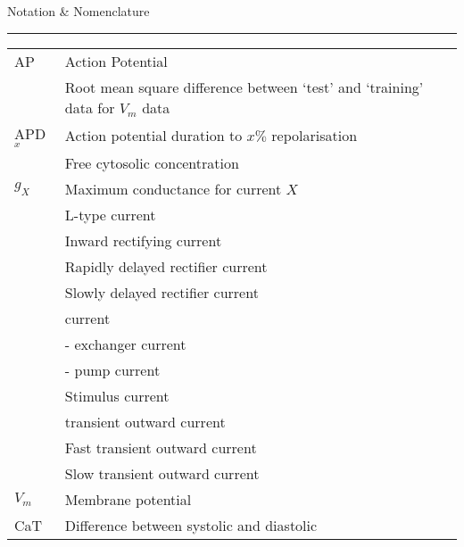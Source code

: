 \documentclass[../thesis-main.tex]{subfiles}
\begin{document}
 \vspace*{10mm}
 {
  \Large\em
  \begin{flushright}
   Notation \& Nomenclature
  \end{flushright}
  \rule{\linewidth}{0.25mm}
 }
 \label{sec:Notation}
 
 \begin{tabular}{p{2.5cm}p{10cm}}
  AP		& Action Potential \\
  \aprms	& Root mean square difference between `test' and `training' data for $V_m$ data \\
  APD$_x$	& Action potential duration to $x\%$ repolarisation \\
  \cai		& Free cytosolic \ca{} concentration \\
  $g_X$		& Maximum conductance for current $X$ \\
  \ica		& L-type \ca{} current \\
  \ikix		& Inward rectifying \K{} current \\
  \ikr		& Rapidly delayed rectifier \K{} current \\
  \iks		& Slowly delayed rectifier \K{} current \\
  \ina		& \na{} current \\
  \inaca	& \na{}-\ca{} exchanger current \\
  \inak		& \na{}-\K{} pump current \\
  \istim	& Stimulus current \\
  \ito		& \K{} transient outward current \\
  \itof		& Fast \K{} transient outward current \\
  \itos		& Slow \K{} transient outward current \\
  $V_m$		& Membrane potential \\
  CaT		& Difference between systolic \cai{} and diastolic \cai{} \\
 \end{tabular}
\end{document}
